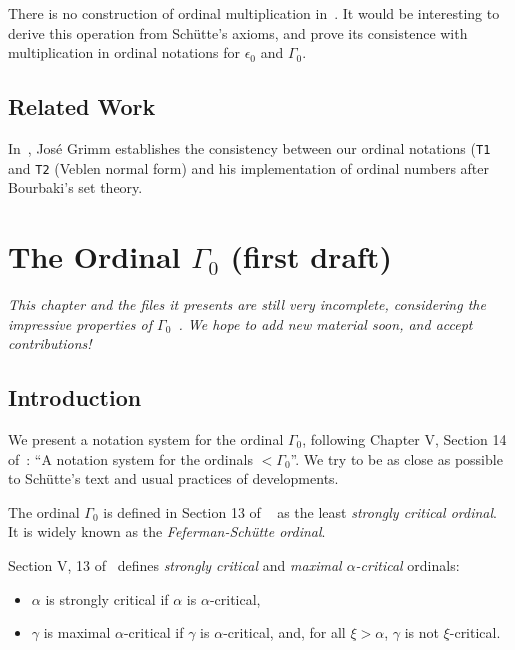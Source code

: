 {
\begin{project}
There is no construction of ordinal multiplication in~\cite{schutte}. 
It would be interesting to derive this operation from Schütte's axioms,
and prove its consistence with multiplication in ordinal notations for 
$\epsilon_0$ and $\Gamma_0$.
\end{project}

\section{Related Work}

In~\cite{grimm:hal-00911710}, José Grimm establishes the consistency between our ordinal notations (\texttt{T1} and \texttt{T2} (Veblen normal form) and his implementation
of ordinal numbers after Bourbaki's set theory.


\chapter{The Ordinal \texorpdfstring{$\Gamma_0$}{Gamma0} (first draft)}


\emph{This chapter and the files it presents are still very incomplete, considering the impressive properties of $\Gamma_0$~\cite{Gallier91}.  We hope to add new material soon, and accept contributions!}


\section{Introduction}
We present a notation system for the ordinal $\Gamma_0$, following Chapter V, Section 14 of~\cite{schutte}: ``A notation system for the ordinals $<\Gamma_0$''.
We try to be as close as possible to Schütte's text and usual practices of \coq{} developments.

The ordinal $\Gamma_0$ is defined in Section 13 of ~\cite{schutte} as the least \emph{strongly critical ordinal}. It is widely known as the \emph{Feferman-Schütte ordinal}.


Section V, 13 of~\cite{schutte} defines \emph{strongly critical} and
\emph{maximal $\alpha$-critical} ordinals: 

\begin{itemize}
\item $\alpha$ is strongly critical if
$\alpha$ is $\alpha$-critical,
\item $\gamma$ is maximal $\alpha$-critical if $\gamma$ is $\alpha$-critical, and, for all $\xi>\alpha$, $\gamma$ is not $\xi$-critical.


\end{itemize}}
